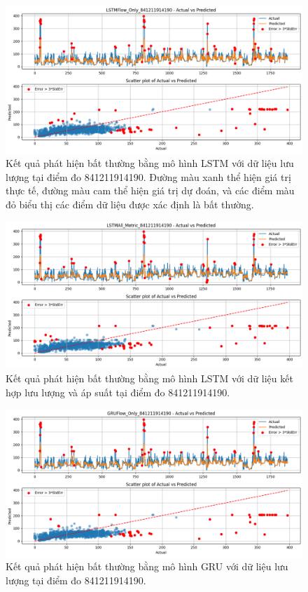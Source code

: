 \begin{figure}[htbp]
    \centering
    \includegraphics[width=\textwidth]{image/section6_3/anomaly_detection_841211914190_lstm_flow.png}
    \caption{Kết quả phát hiện bất thường bằng mô hình LSTM với dữ liệu lưu lượng tại điểm đo 841211914190. Đường màu xanh thể hiện giá trị thực tế, đường màu cam thể hiện giá trị dự đoán, và các điểm màu đỏ biểu thị các điểm dữ liệu được xác định là bất thường.}
    \label{fig:anomaly_lstm_841211914190_flow}
\end{figure}

\begin{figure}[htbp]
    \centering
    \includegraphics[width=\textwidth]{image/section6_3/anomaly_detection_841211914190_lstm_allmetric.png}
    \caption{Kết quả phát hiện bất thường bằng mô hình LSTM với dữ liệu kết hợp lưu lượng và áp suất tại điểm đo 841211914190.}
    \label{fig:anomaly_lstm_841211914190_all}
\end{figure}

\begin{figure}[htbp]
    \centering
    \includegraphics[width=\textwidth]{image/section6_3/anomaly_detection_841211914190_gru_flow.png}
    \caption{Kết quả phát hiện bất thường bằng mô hình GRU với dữ liệu lưu lượng tại điểm đo 841211914190.}
    \label{fig:anomaly_gru_841211914190_flow}
\end{figure}

